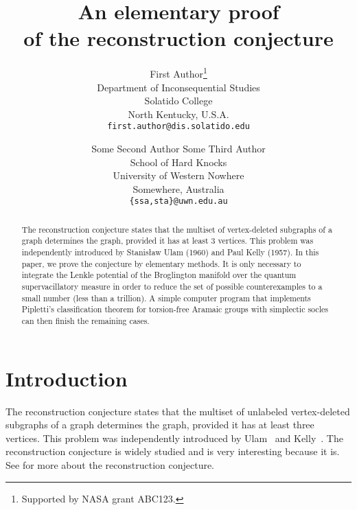 \documentclass[12pt]{article}
\title{An elementary proof\\ of the reconstruction conjecture}
\author{First Author\thanks{Supported by NASA grant ABC123.}\\
\small Department of Inconsequential Studies\\[-0.8ex]
\small Solatido College\\[-0.8ex] 
\small North Kentucky, U.S.A.\\
\small\tt first.author@dis.solatido.edu\\
\and
Some Second Author \qquad  Some Third Author\\
\small School of Hard Knocks\\[-0.8ex]
\small University of Western Nowhere\\[-0.8ex]
\small Somewhere, Australia\\
\small\tt \{ssa,sta\}@uwn.edu.au}
\begin{document}
\maketitle


\begin{abstract}
  The reconstruction conjecture states that the multiset of 
  vertex-deleted subgraphs of a graph determines the graph, provided
  it has at least 3 vertices.  This problem was independently introduced
  by Stanis\l aw Ulam (1960) and Paul Kelly (1957). In this paper,
  we prove the conjecture by elementary methods. 
  It is only necessary
  to integrate the Lenkle potential of the Broglington manifold over
  the quantum supervacillatory measure in order to reduce the set of
  possible counterexamples to a small number (less than a trillion).
  A simple computer program that implements Pipletti's classification
  theorem for torsion-free Aramaic groups with simplectic socles can
  then finish the remaining cases.
\end{abstract}

\section{Introduction}

The reconstruction conjecture states that the multiset of unlabeled
vertex-deleted subgraphs of a graph determines the graph, provided it
has at least three vertices.  This problem was independently introduced
by Ulam~\cite{Ulam} and Kelly~\cite{Kelly}.  The reconstruction
conjecture is widely studied
\cite{Bollobas,FGH,HHRT,KSU,Stockmeyer,WS} and is very interesting
because it is. See \cite{BH} for more about the
reconstruction conjecture.
\end{document}
